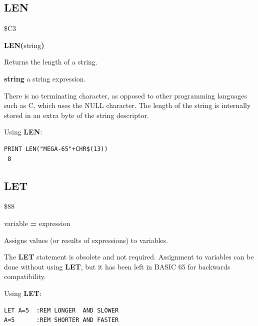 \subsection{LEN}
\begin{description}[leftmargin=2cm,style=nextline]
\item [Token:] \$C3
\item [Format:] {\bf LEN(}string{\bf)}
\item [Usage:] Returns the length of a string.

               {\bf string} a string expression.

\item [Remarks:] There is no terminating character, as opposed to
                 other programming languages such as C, which uses
                 the NULL character. The length of
                 the string is internally stored in an extra byte of
                 the string descriptor.

\item [Example:] Using {\bf LEN}:
\begin{tcolorbox}[colback=black,coltext=white]
\verbatimfont{\codefont}
\begin{verbatim}
PRINT LEN("MEGA-65"+CHR$(13))
 8
\end{verbatim}
\end{tcolorbox}
\end{description}


\newpage
\subsection{LET}
\begin{description}[leftmargin=2cm,style=nextline]
\item [Token:] \$88
\item [Format:] [{\bf LET}] variable {\bf=} expression
\item [Usage:] Assigns values (or results of expressions) to variables.
\item [Remarks:] The {\bf LET} statement is obsolete and not required.
               Assignment to variables can be done without using
               {\bf LET}, but it has been left in BASIC 65 for backwards compatibility.

\item [Examples:] Using {\bf LET}:
\begin{tcolorbox}[colback=black,coltext=white]
\verbatimfont{\codefont}
\begin{verbatim}
LET A=5  :REM LONGER  AND SLOWER
A=5      :REM SHORTER AND FASTER
\end{verbatim}
\end{tcolorbox}
\end{description}

